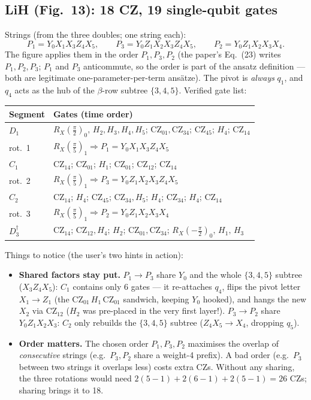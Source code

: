 \documentclass[11pt]{article}
\newcommand{\RX}{R_X}
\begin{document}
\subsection{LiH (Fig.~13): 18 CZ, 19 single-qubit gates}
Strings (from the three doubles; one string each):
\begin{equation}
P_1=Y_0X_1X_3Z_4X_5,\qquad
P_3=Y_0Z_1X_2X_3Z_4X_5,\qquad
P_2=Y_0Z_1X_2X_3X_4 .
\end{equation}
The figure applies them in the order $P_1,P_3,P_2$ (the paper's Eq.~(23)
writes $P_1,P_2,P_3$; $P_1$ and $P_3$ anticommute, so the order is part of
the ansatz definition --- both are legitimate one-parameter-per-term
ans\"atze). The pivot is \emph{always} $q_1$, and $q_4$ acts as the hub of
the $\beta$-row subtree $\{3,4,5\}$. Verified gate list:
\begin{center}\small
\begin{tabular}{ll}
\toprule
Segment & Gates (time order)\\
\midrule
$D_1$ &
 $\RX(\tfrac{\pi}{2})_0,\,H_2,H_3,H_4,H_5$;\;
 $\mathrm{CZ}_{01},\mathrm{CZ}_{34}$;\; $\mathrm{CZ}_{45}$;\; $H_4$;\; $\mathrm{CZ}_{14}$\\
rot.\ 1 & $\RX(\tfrac{\pi}{5})_1 \Rightarrow P_1=Y_0X_1X_3Z_4X_5$\\
$C_1$ & $\mathrm{CZ}_{14}$;\; $\mathrm{CZ}_{01}$;\; $H_1$;\;
        $\mathrm{CZ}_{01}$;\; $\mathrm{CZ}_{12}$;\; $\mathrm{CZ}_{14}$\\
rot.\ 2 & $\RX(\tfrac{\pi}{5})_1 \Rightarrow P_3=Y_0Z_1X_2X_3Z_4X_5$\\
$C_2$ & $\mathrm{CZ}_{14}$;\; $H_4$;\; $\mathrm{CZ}_{45}$;\;
        $\mathrm{CZ}_{34},H_5$;\; $H_4$;\; $\mathrm{CZ}_{34}$;\; $H_4$;\; $\mathrm{CZ}_{14}$\\
rot.\ 3 & $\RX(\tfrac{\pi}{5})_1 \Rightarrow P_2=Y_0Z_1X_2X_3X_4$\\
$D_3^\dagger$ & $\mathrm{CZ}_{14}$;\; $\mathrm{CZ}_{12},H_4$;\; $H_2$;\;
        $\mathrm{CZ}_{01},\mathrm{CZ}_{34}$;\; $\RX(-\tfrac{\pi}{2})_0,\,H_1,\,H_3$\\
\bottomrule
\end{tabular}
\end{center}
Things to notice (the user's two hints in action):
\begin{itemize}
\item \textbf{Shared factors stay put.} $P_1\!\to\!P_3$ share
  $Y_0$ and the whole $\{3,4,5\}$ subtree ($X_3Z_4X_5$): $C_1$ contains only
  6 gates --- it re-attaches $q_4$, flips the pivot letter
  $X_1\!\to\!Z_1$ (the $\mathrm{CZ}_{01}\,H_1\,\mathrm{CZ}_{01}$ sandwich,
  keeping $Y_0$ hooked), and hangs the new $X_2$ via $\mathrm{CZ}_{12}$
  ($H_2$ was pre-placed in the very first layer!). $P_3\!\to\!P_2$ share
  $Y_0Z_1X_2X_3$: $C_2$ only rebuilds the $\{3,4,5\}$ subtree
  ($Z_4X_5 \to X_4$, dropping $q_5$).
\item \textbf{Order matters.} The chosen order $P_1,P_3,P_2$ maximises the
  overlap of \emph{consecutive} strings (e.g.\ $P_3,P_2$ share a weight-4
  prefix). A bad order (e.g.\ $P_3$ between two strings it overlaps less)
  costs extra CZs. Without any sharing, the three rotations would need
  $2(5\!-\!1)+2(6\!-\!1)+2(5\!-\!1)=26$ CZs; sharing brings it to 18.
\end{itemize}
\end{document}
